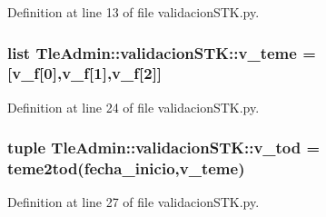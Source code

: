 \-Definition at line 13 of file validacion\-S\-T\-K.\-py.

\subsubsection[{v\-\_\-teme}]{\setlength{\rightskip}{0pt plus 5cm}list {\bf \-Tle\-Admin\-::validacion\-S\-T\-K\-::v\-\_\-teme} = [v\-\_\-f[0],v\-\_\-f[1],v\-\_\-f[2]]}\label{namespace_tle_admin_1_1validacion_s_t_k_a2436276efed51469366b9d2bdfc3e0fd}


\-Definition at line 24 of file validacion\-S\-T\-K.\-py.

\subsubsection[{v\-\_\-tod}]{\setlength{\rightskip}{0pt plus 5cm}tuple {\bf \-Tle\-Admin\-::validacion\-S\-T\-K\-::v\-\_\-tod} = teme2tod({\bf fecha\-\_\-inicio},{\bf v\-\_\-teme})}\label{namespace_tle_admin_1_1validacion_s_t_k_a44ba7e688bc77585aabdaa60c0b1a9d5}


\-Definition at line 27 of file validacion\-S\-T\-K.\-py.

